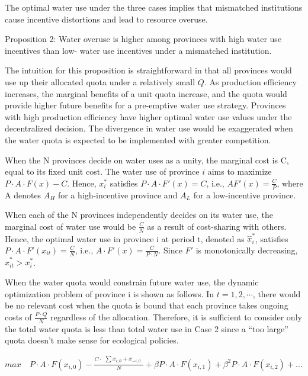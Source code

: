 \documentclass[preprint, 12pt]{elsarticle}
\providecommand{\DIFaddbegin}{} %
\providecommand{\DIFaddend}{} %
\begin{document}
The optimal water use under the three cases implies that mismatched institutions cause incentive distortions and lead to resource overuse.


Proposition 2: Water overuse is higher among provinces with high water use incentives than low- water use incentives under a mismatched institution.

The intuition for this proposition is straightforward in that all provinces would use up their allocated quota under a relatively small $Q$. As production efficiency increases, the marginal benefits of a unit quota increase, and the quota would provide higher future benefits for a pre-emptive water use strategy. Provinces with high production efficiency have higher optimal water use values under the decentralized decision. The divergence in water use would be exaggerated when the water quota is expected to be implemented with greater competition.

\DIFaddbegin


\DIFaddend When the N provinces decide on water uses as a unity, the marginal cost is C, equal to its fixed unit cost.
The water use of province $i$ aims to maximize $P\cdot A\cdot F(x)-C$.
Hence, $x_i^*$ satisfies $P \cdot A\cdot F'(x)=C$, i.e., $AF'(x)=\frac{C}{P}$, where A denotes $A_H$ for a high-incentive province and $A_L$ for a low-incentive province.

When each of the N provinces independently decides on its water use, the marginal cost of water use would be $\frac{C}{N}$ as a result of cost-sharing with others.
Hence, the optimal water use in province i at period t, denoted as $\hat x_i^*$, satisfies $P \cdot A \cdot F'(x_{it})=\frac{C}{N}$, i.e., $A \cdot F'(x)=\frac{C}{P \cdot N}$.
Since $F'$ is monotonically decreasing, $\hat x_{it}^*>x_i^*$.

When the water quota would constrain future water use, the dynamic optimization problem of province i is shown as follows. In $t=1,2,\cdots$, there would be no relevant cost when the quota is bound that each province takes ongoing costs of $\frac{P \cdot Q}{N}$ regardless of the allocation. Therefore, it is sufficient to consider only the total water quota is less than total water use in Case 2 since a ``too large'' quota doesn't make sense for ecological policies.

$max  \quad P \cdot A \cdot F(x_{i,0})-\frac{C \cdot \begin{matrix} \sum x_{i,0} + x_{-i,0} \end{matrix}}{N}+\beta P \cdot A \cdot F(x_{i,1})+\beta^2 P \cdot A \cdot F(x_{i,2})+...$
\end{document}
